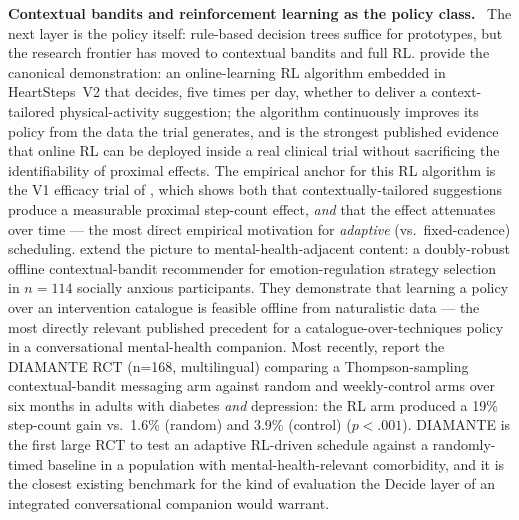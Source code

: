 \documentclass[10pt,conference]{article}
\renewcommand{\paragraph}[1]{\smallskip\par\noindent\textbf{#1}~\ignorespaces}
\begin{document}
\paragraph{Contextual bandits and reinforcement learning as the policy class.}
The next layer is the policy itself: rule-based decision trees suffice
for prototypes, but the research frontier has moved to contextual
bandits and full RL. \cite{Liao2020PersonalizedHeartSteps} provide the
canonical demonstration: an online-learning RL algorithm embedded in
HeartSteps~V2 that decides, five times per day, whether to deliver a
context-tailored physical-activity suggestion; the algorithm
continuously improves its policy from the data the trial generates,
and is the strongest published evidence that online RL can be
deployed inside a real clinical trial without sacrificing the
identifiability of proximal effects. The empirical anchor for this RL
algorithm is the V1 efficacy trial of \cite{Klasnja2018HeartStepsMRT},
which shows both that contextually-tailored suggestions produce a
measurable proximal step-count effect, \emph{and} that the effect
attenuates over time --- the most direct empirical motivation for
\emph{adaptive} (vs.\ fixed-cadence) scheduling.
\cite{Ameko2020CMABEmotion} extend the picture to mental-health-adjacent
content: a doubly-robust offline contextual-bandit recommender for
emotion-regulation strategy selection in $n\!=\!114$ socially anxious
participants. They demonstrate that learning a policy over an
intervention catalogue is feasible offline from naturalistic data ---
the most directly relevant published precedent for a
catalogue-over-techniques policy in a conversational mental-health
companion. Most recently,
\cite{Aguilera2024DIAMANTERL} report the DIAMANTE RCT
(n=168, multilingual) comparing a Thompson-sampling contextual-bandit
messaging arm against random and weekly-control arms over six months
in adults with diabetes \emph{and} depression: the RL arm produced a
19\% step-count gain vs.\ 1.6\% (random) and 3.9\% (control)
($p<.001$). DIAMANTE is the first large RCT to test an adaptive
RL-driven schedule against a randomly-timed baseline in a population
with mental-health-relevant comorbidity, and it is the closest existing
benchmark for the kind of evaluation the Decide layer of an
integrated conversational companion would warrant.
\end{document}
